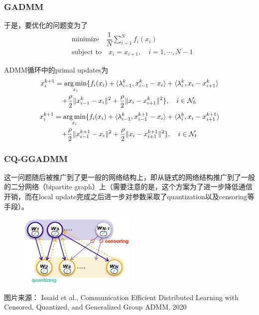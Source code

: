 \begin{frame}
\frametitle{GADMM}

于是，要优化的问题变为了
\begin{align*}
    & \text{minimize} \quad \dfrac{1}{N} \sum\limits_{i=1}^N f_i(x_i) \\
    & \text{subject to} \quad x_i = x_{i+1}, \quad i=1,\cdots,N-1
\end{align*}

ADMM循环中的primal updates为
\begin{multline*}
    x_i^{k+1} = \operatorname*{arg\,min}\limits_{x_i} \{ f_i(x_i) + \langle \lambda_{i-1}^k, x_{i-1}^k - x_i \rangle + \langle \lambda_{i}^k, x_{i} - x_{i+1}^k \rangle \\
    + \dfrac{\rho}{2}\lVert x_{i-1}^k - x_i \rVert^2 + \dfrac{\rho}{2}\lVert x_{i} - x_{i+1}^k \rVert^2 \}, \quad i \in \mathcal{N}_h
\end{multline*}
\begin{multline*}
    x_i^{k+1} = \operatorname*{arg\,min}\limits_{x_i} \{ f_i(x_i) + \langle \lambda_{i-1}^k, x_{i-1}^{k+1} - x_i \rangle + \langle \lambda_{i}^k, x_{i} - x_{i+1}^{k+1} \rangle \\
    + \dfrac{\rho}{2}\lVert x_{i-1}^{k+1} - x_i \rVert^2 + \dfrac{\rho}{2}\lVert x_{i} - x_{i+1}^{k+1} \rVert^2 \}, \quad i \in \mathcal{N}_t
\end{multline*}

\end{frame}


\begin{frame}
\frametitle{CQ-GGADMM}

这一问题随后被推广到了更一般的网络结构上，即从链式的网络结构推广到了一般的二分网络（bipartite graph）上（需要注意的是，这个方案为了进一步降低通信开销，而在local update完成之后进一步对参数采取了quantization以及censoring等手段）。

\begin{figure}[H]
    \centering
    \includegraphics[width=0.5\textwidth,keepaspectratio]{images/CQ-GGADMM.png}
\end{figure}
{\scriptsize 图片来源：\cite{issaid2020cq-ggadmm} Issaid et al., Communication Efficient Distributed Learning with Censored, Quantized, and Generalized Group ADMM, 2020}

\end{frame}

